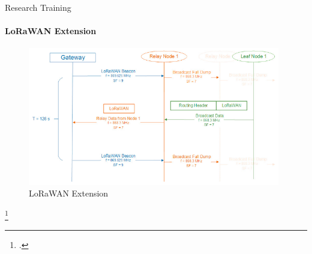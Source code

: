 \begin{frame}{Research Training}
\framesubtitle{LoRaWAN Extension}
\begin{figure}[H]
    \centering
    \includegraphics[width=0.98\textwidth]{presentation.tex/fig/lorawanextension.png}
    \caption{LoRaWAN Extension\footnotemark}
\end{figure}

\footcitetext{DIAS2018424}
\end{frame}

